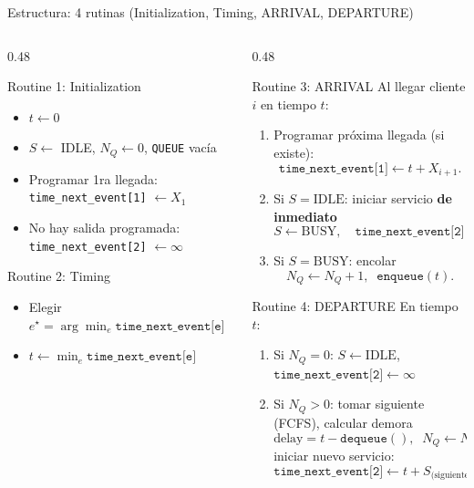 \documentclass[aspectratio=1610, 9pt]{beamer}
\begin{document}
\begin{frame}{Estructura: 4 rutinas (Initialization, Timing, ARRIVAL, DEPARTURE)}
\footnotesize
\begin{columns}[T,totalwidth=\textwidth]
\begin{column}{0.48\textwidth}
\begin{block}{Routine 1: Initialization}
\begin{itemize}
\item $t \leftarrow 0$
\item $S \leftarrow$ IDLE,\; $N_Q \leftarrow 0$, \texttt{QUEUE} vacía
\item Programar 1ra llegada: \texttt{time\_next\_event[1]} $\leftarrow X_1$
\item No hay salida programada: \texttt{time\_next\_event[2]} $\leftarrow \infty$
\end{itemize}
\end{block}

\begin{block}{Routine 2: Timing}
\begin{itemize}
\item Elegir $e^\star=\arg\min_e \texttt{time\_next\_event[e]}$
\item $t \leftarrow \min_e \texttt{time\_next\_event[e]}$
\end{itemize}
\end{block}
\end{column}

\begin{column}{0.48\textwidth}
\begin{block}{Routine 3: ARRIVAL}
Al llegar cliente $i$ en tiempo $t$:
\begin{enumerate}
\item Programar próxima llegada (si existe):
\[
\texttt{time\_next\_event[1]}\leftarrow t+X_{i+1}.
\]
\item Si $S=\text{IDLE}$: iniciar servicio \textbf{de inmediato}
\[
S\leftarrow \text{BUSY},\quad
\texttt{time\_next\_event[2]}\leftarrow t+S_i.
\]
\item Si $S=\text{BUSY}$: encolar
\[
N_Q\leftarrow N_Q+1,\;\; \texttt{enqueue}(t).
\]
\end{enumerate}
\end{block}

\begin{block}{Routine 4: DEPARTURE}
En tiempo $t$:
\begin{enumerate}
\item Si $N_Q=0$: $S\leftarrow \text{IDLE}$,\quad $\texttt{time\_next\_event[2]}\leftarrow \infty$
\item Si $N_Q > 0$: tomar siguiente (FCFS), calcular demora
\[
\text{delay}=t-\texttt{dequeue}(),\;\;
N_Q\leftarrow N_Q-1,
\]
iniciar nuevo servicio:
\[
\texttt{time\_next\_event[2]}\leftarrow t+S_{\text{(siguiente)}}.
\]
\end{enumerate}
\end{block}
\end{column}
\end{columns}
\end{frame}
\end{document}
